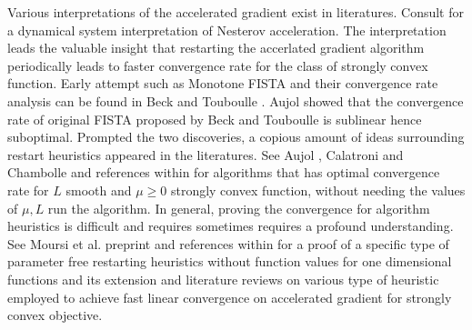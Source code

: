 \documentclass[12pt]{article}
\begin{document}
        \par
        Various interpretations of the accelerated gradient exist in literatures. 
        Consult \cite{su_differential_2016} for a dynamical system interpretation of Nesterov acceleration. 
        The interpretation leads the valuable insight that restarting the accerlated gradient algorithm periodically leads to faster convergence rate for the class of strongly convex function. 
        Early attempt such as Monotone FISTA and their convergence rate analysis can be found in Beck and Touboulle \cite{beck_fast_2009}. 
        Aujol \cite{aujol_optimal_2019} showed that the convergence rate of original FISTA proposed by Beck and Touboulle \cite{beck_fast_2009} is sublinear hence suboptimal. 
        Prompted the two discoveries, a copious amount of ideas surrounding restart heuristics appeared in the literatures. 
        See Aujol \cite{aujol_parameter-free_2024}, Calatroni and Chambolle \cite{calatroni_backtracking_2019} and references within for algorithms that has optimal convergence rate for $L$ smooth and $\mu \ge 0$ strongly convex function, without needing the values of $\mu, L$ run the algorithm. 
        In general, proving the convergence for algorithm heuristics is difficult and requires sometimes requires a profound understanding. 
        See Moursi et al. \cite{moursi_accelerated_2023} preprint and references within for a proof of a specific type of parameter free restarting heuristics without function values for one dimensional functions and its extension and literature reviews on various type of heuristic employed to achieve fast linear convergence on accelerated gradient for strongly convex objective. 

\end{document}
